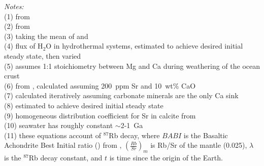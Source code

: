 \begin{table}
	\flushleft \emph{Notes:} \\
    (1) from \citet{Turekian1961a}\\
    (2) from \citet{Wedepohl1995a}\\
    (3) taking the mean of \citet{Turekian1961a} and \citet{Taylor1964a}\\
    (4) flux of H$_{2}$O in hydrothermal systems, estimated to achieve desired initial steady state, then varied\\
    (5) assumes 1:1 stoichiometry between Mg and Ca during weathering of the ocean crust\\
    (6) from \citet{Maloof2010a}, calculated assuming 200~ppm Sr and 10~wt\% CaO\\
    (7) calculated iteratively assuming carbonate minerals are the only Ca sink\\
    (8) estimated to achieve desired initial steady state\\
    (9) homogeneous distribution coefficient for Sr in calcite from \citet{Mucci1983a}\\
    (10) seawater has roughly constant \SrSr $\sim$2-1~Ga \citep{Shields2002a}\\
    (11) these equations account of $^{87}$Rb decay, where $BABI$ is the Basaltic Achondrite Best Initial ratio () from \citet{Papanastassiou1968a}, $\left(\frac{Rb}{Sr}\right)_{m}$ is Rb/Sr of the mantle (0.025), $\lambda$ is the $^{87}$Rb decay constant, and $t$ is time since the origin of the Earth.
	\label{tab:seawater-model-variables}
\end{table}
